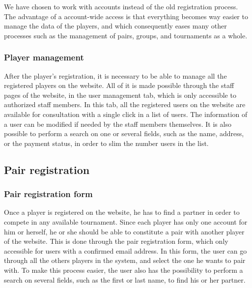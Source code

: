 We have chosen to work with accounts instead of the old registration process.
The advantage of a account-wide access is that everything becomes way easier
to manage the data of the players, and which consequently eases many other
processes such as the management of pairs, groups, and tournaments as a whole.

\subsubsection{Player management}
\label{subs:Player management}


After the player's registration, it is necessary to be able to manage all the
registered players on the website. All of it is made possible through the staff
pages of the website, in the user management tab, which is only accessible
to authorized staff members. In this tab, all the registered users on the
website are available for consultation with a single click in a list of users.
The information of a user can be modified if needed by the staff members
themselves. It is also possible to perform a search on one or several fields,
such as the name, address, or the payment status, in order to slim the number
users in the list.

\subsection{Pair registration}
\label{sub:Pair registration}

\subsubsection{Pair registration form}
\label{subs:Pair registration form}


Once a player is registered on the website, he has to find a partner in order
to compete in any available tournament. Since each player has only one account
for him or herself, he or she should be able to constitute a pair with another
player of the website. This is done through the pair registration form,
which only accessible for users with a confirmed email address. In this form,
the user can go through all the others players in the system, and select
the one he wants to pair with. To make this process easier, the user also has
the possibility to perform a search on several fields, such as the first or
last name, to find his or her partner. \newline

